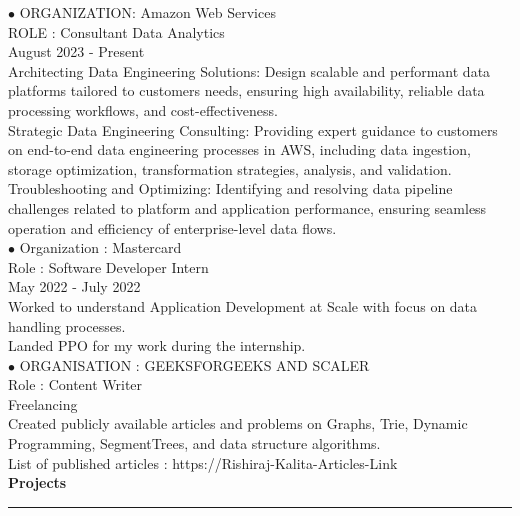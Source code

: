 \documentclass[11pt,a4paper]{article}
\renewcommand{\section}[1]{%
  \vspace{12pt}%
  {\large\bfseries #1}%
  \vspace{6pt}%
  \hrule%
  \vspace{6pt}%
}
\begin{document}
\noindent $\bullet$ ORGANIZATION: Amazon Web Services\\[0.2cm]
ROLE : Consultant Data Analytics\\[0.2cm]
August 2023 - Present\\[0.2cm]
Architecting Data Engineering Solutions: Design scalable and performant data platforms tailored to customers needs, ensuring high availability, reliable data processing workflows, and cost-effectiveness.\\[0.2cm]
Strategic Data Engineering Consulting: Providing expert guidance to customers on end-to-end data engineering processes in AWS, including data ingestion, storage optimization, transformation strategies, analysis, and validation.\\[0.2cm]
Troubleshooting and Optimizing: Identifying and resolving data pipeline challenges related to platform and application performance, ensuring seamless operation and efficiency of enterprise-level data flows.\\[0.2cm]
\noindent $\bullet$ Organization : Mastercard\\[0.2cm]
Role : Software Developer Intern\\[0.2cm]
May 2022 - July 2022\\[0.2cm]
Worked to understand Application Development at Scale with focus on data handling processes.\\[0.2cm]
Landed PPO for my work during the internship.\\[0.2cm]
\noindent $\bullet$ ORGANISATION : GEEKSFORGEEKS AND SCALER\\[0.2cm]
Role : Content Writer\\[0.2cm]
Freelancing\\[0.2cm]
Created publicly available articles and problems on Graphs, Trie, Dynamic Programming, SegmentTrees, and data structure algorithms.\\[0.2cm]
List of published articles : https://Rishiraj-Kalita-Articles-Link\\[0.2cm]
\section{Projects}
\end{document}
